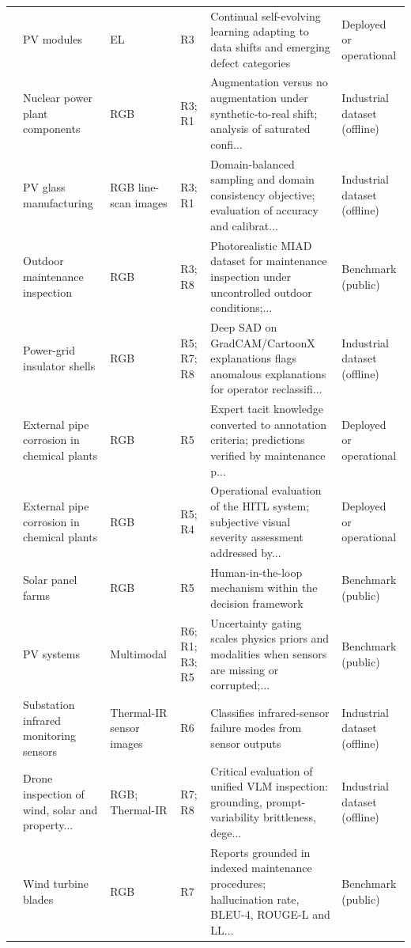 \begin{table}[t]
\begin{tabularx}{\textwidth}{p{}p{}p{}p{}Yp{0.11\textwidth}}
\cite{he2026self} & PV modules & EL & R3 & Continual self-evolving learning adapting to data shifts and emerging defect categories & Deployed or operational \\
\cite{avramov2026synthetic} & Nuclear power plant components & RGB & R3; R1 & Augmentation versus no augmentation under synthetic-to-real shift; analysis of saturated confi... & Industrial dataset (offline) \\
\cite{bence2026yolov} & PV glass manufacturing & RGB line-scan images & R3; R1 & Domain-balanced sampling and domain consistency objective; evaluation of accuracy and calibrat... & Industrial dataset (offline) \\
\cite{bao2023miad} & Outdoor maintenance inspection & RGB & R3; R8 & Photorealistic MIAD dataset for maintenance inspection under uncontrolled outdoor conditions;... & Benchmark (public) \\
\cite{floreale2025automated} & Power-grid insulator shells & RGB & R5; R7; R8 & Deep SAD on GradCAM/CartoonX explanations flags anomalous explanations for operator reclassifi... & Industrial dataset (offline) \\
\cite{shimbo2023pipe} & External pipe corrosion in chemical plants & RGB & R5 & Expert tacit knowledge converted to annotation criteria; predictions verified by maintenance p... & Deployed or operational \\
\cite{shimbo2023operation} & External pipe corrosion in chemical plants & RGB & R5; R4 & Operational evaluation of the HITL system; subjective visual severity assessment addressed by... & Deployed or operational \\
\cite{amorim2025collaborative} & Solar panel farms & RGB & R5 & Human-in-the-loop mechanism within the decision framework & Benchmark (public) \\
\cite{khandagale2026meta} & PV systems & Multimodal & R6; R1; R3; R5 & Uncertainty gating scales physics priors and modalities when sensors are missing or corrupted;... & Benchmark (public) \\
\cite{hu2025fault} & Substation infrared monitoring sensors & Thermal-IR sensor images & R6 & Classifies infrared-sensor failure modes from sensor outputs & Industrial dataset (offline) \\
\cite{wallace2025inspectvlm} & Drone inspection of wind, solar and property... & RGB; Thermal-IR & R7; R8 & Critical evaluation of unified VLM inspection: grounding, prompt-variability brittleness, dege... & Industrial dataset (offline) \\
\cite{malikussaid2026hybrid} & Wind turbine blades & RGB & R7 & Reports grounded in indexed maintenance procedures; hallucination rate, BLEU-4, ROUGE-L and LL... & Benchmark (public) \\
\bottomrule
\end{tabularx}
\end{table}
